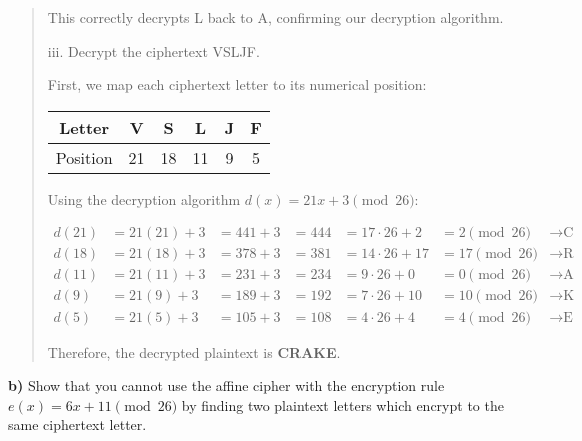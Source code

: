 \documentclass[12pt]{article}
\begin{document}
\begin{quote}
This correctly decrypts L back to A, confirming our decryption algorithm.

\vspace{0.5cm}

iii. Decrypt the ciphertext VSLJF.

\vspace{0.3cm}

First, we map each ciphertext letter to its numerical position:

\begin{center}
\begin{tabular}{|c|c|c|c|c|c|}
\hline
Letter & V & S & L & J & F \\
\hline
Position & 21 & 18 & 11 & 9 & 5 \\
\hline
\end{tabular}
\end{center}

\vspace{0.5cm}

Using the decryption algorithm $d(x) = 21x + 3 \pmod{26}$:

\begin{align*}
d(21) &= 21(21) + 3 &= 441 + 3 &= 444 &= 17 \cdot 26 + 2 &= 2 \pmod{26} &\rightarrow \text{C}\\
d(18) &= 21(18) + 3 &= 378 + 3 &= 381 &= 14 \cdot 26 + 17 &= 17 \pmod{26} &\rightarrow \text{R}\\
d(11) &= 21(11) + 3 &= 231 + 3 &= 234 &= 9 \cdot 26 + 0 &= 0 \pmod{26} &\rightarrow \text{A}\\
d(9)  &= 21(9) + 3  &= 189 + 3 &= 192 &= 7 \cdot 26 + 10 &= 10 \pmod{26} &\rightarrow \text{K}\\
d(5)  &= 21(5) + 3  &= 105 + 3 &= 108 &= 4 \cdot 26 + 4 &= 4 \pmod{26} &\rightarrow \text{E}
\end{align*}

\vspace{0.5cm}

Therefore, the decrypted plaintext is \textbf{CRAKE}.


\end{quote}

\vspace{0.5cm}

\noindent\textbf{b)} Show that you cannot use the affine cipher with the encryption rule $e(x) = 6x + 11 \pmod{26}$ by finding two plaintext letters which encrypt to the same ciphertext letter.

\vspace{0.3cm}
\end{document}
